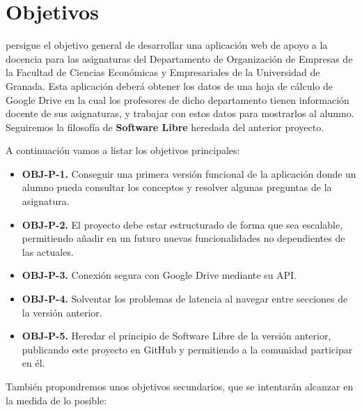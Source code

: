 \chapter{Objetivos}

{\titulo} persigue el objetivo general de desarrollar una aplicación web de apoyo a la docencia para las asignaturas del Departamento de Organización de Empresas de la Facultad de Ciencias Económicas y Empresariales de la Universidad de Granada. Esta aplicación deberá obtener los datos de una hoja de cálculo de Google Drive en la cual los profesores de dicho departamento tienen información docente de sus asignaturas, y trabajar con estos datos para mostrarlos al alumno. Seguiremos la filosofía de \textbf{Software Libre} heredada del anterior proyecto.




\bigskip
A continuación vamos a listar los objetivos principales:

\begin{itemize}
  \item \textbf{OBJ-P-1.} Conseguir una primera versión funcional de la aplicación donde un alumno pueda consultar los conceptos y resolver algunas preguntas de la asignatura.
  \item \textbf{OBJ-P-2.} El proyecto debe estar estructurado de forma que sea escalable, permitiendo añadir en un futuro nuevas funcionalidades no dependientes de las actuales.
  \item \textbf{OBJ-P-3.} Conexión segura con Google Drive mediante su API.
  \item \textbf{OBJ-P-4.} Solventar los problemas de latencia al navegar entre secciones de la versión anterior.
  \item \textbf{OBJ-P-5.} Heredar el principio de Software Libre de la versión anterior, publicando este proyecto en GitHub y permitiendo a la comunidad participar en él.
\end{itemize}


\bigskip
También propondremos unos objetivos secundarios, que se intentarán alcanzar en la medida de lo posible:


